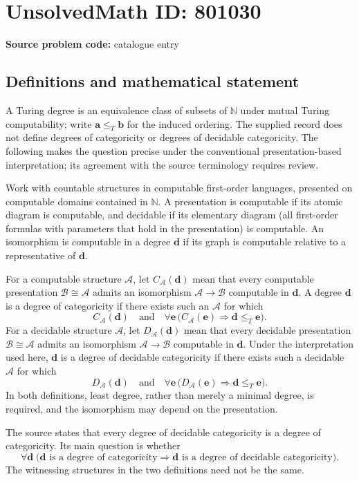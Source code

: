 \documentclass[11pt]{article}
\newcommand{\N}{\mathbb{N}}
\begin{document}
\section*{UnsolvedMath ID: 801030}
\textbf{Source problem code:} catalogue entry
\subsection{Definitions and mathematical statement}
A Turing degree is an equivalence class of subsets of \(\N\) under mutual Turing computability; write \(\mathbf a\leq_T\mathbf b\) for the induced ordering. The supplied record does not define degrees of categoricity or degrees of decidable categoricity. The following makes the question precise under the conventional presentation-based interpretation; its agreement with the source terminology requires review.

Work with countable structures in computable first-order languages, presented on computable domains contained in \(\N\). A presentation is computable if its atomic diagram is computable, and decidable if its elementary diagram (all first-order formulas with parameters that hold in the presentation) is computable. An isomorphism is computable in a degree \(\mathbf d\) if its graph is computable relative to a representative of \(\mathbf d\).

For a computable structure \(\mathcal A\), let \(C_{\mathcal A}(\mathbf d)\) mean that every computable presentation \(\mathcal B\cong\mathcal A\) admits an isomorphism \(\mathcal A\to\mathcal B\) computable in \(\mathbf d\). A degree \(\mathbf d\) is a degree of categoricity if there exists such an \(\mathcal A\) for which
\[
C_{\mathcal A}(\mathbf d)\quad\text{and}\quad
\forall\mathbf e\,\bigl(C_{\mathcal A}(\mathbf e)\Longrightarrow\mathbf d\leq_T\mathbf e\bigr).
\]
For a decidable structure \(\mathcal A\), let \(D_{\mathcal A}(\mathbf d)\) mean that every decidable presentation \(\mathcal B\cong\mathcal A\) admits an isomorphism \(\mathcal A\to\mathcal B\) computable in \(\mathbf d\). Under the interpretation used here, \(\mathbf d\) is a degree of decidable categoricity if there exists such a decidable \(\mathcal A\) for which
\[
D_{\mathcal A}(\mathbf d)\quad\text{and}\quad
\forall\mathbf e\,\bigl(D_{\mathcal A}(\mathbf e)\Longrightarrow\mathbf d\leq_T\mathbf e\bigr).
\]
In both definitions, least degree, rather than merely a minimal degree, is required, and the isomorphism may depend on the presentation.

The source states that every degree of decidable categoricity is a degree of categoricity. Its main question is whether
\[
\forall\mathbf d\;\bigl(\mathbf d\text{ is a degree of categoricity}
\Longrightarrow
\mathbf d\text{ is a degree of decidable categoricity}\bigr).
\]
The witnessing structures in the two definitions need not be the same.
\end{document}
